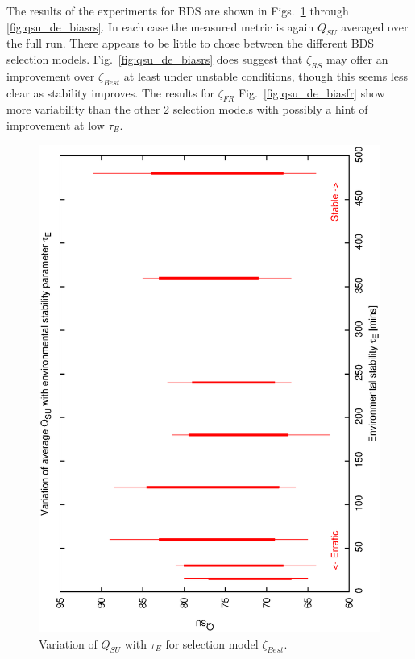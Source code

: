 The results of the experiments for BDS are shown in Figs.~\ref{fig:qsu_de_best} through \ref{fig:qsu_de_biasrs}. In each case the measured metric is again $Q_{SU}$ averaged over the full run. There appears to be little to chose between the different BDS selection models. Fig.~\ref{fig:qsu_de_biasrs} does suggest that $\zeta_{RS}$ may offer an improvement over $\zeta_{Best}$ at least under unstable conditions, though this seems less clear as stability improves. The results for $\zeta_{FR}$ Fig.~\ref{fig:qsu_de_biasfr} show more variability than the other 2 selection models with possibly a hint of improvement at low $\tau_E$.
 
\begin{figure}[h]

\begin{center}
 \includegraphics[scale=0.5, angle=-90]{figures/best_de.eps}
 \caption[Variation of $Q_{SU}$ with $\tau_E$ for selection model $\zeta_{Best}$.] 
   {Variation of $Q_{SU}$ with $\tau_E$ for selection model $\zeta_{Best}$.}
\label{fig:qsu_de_best}
\end{center} 
\end{figure}

